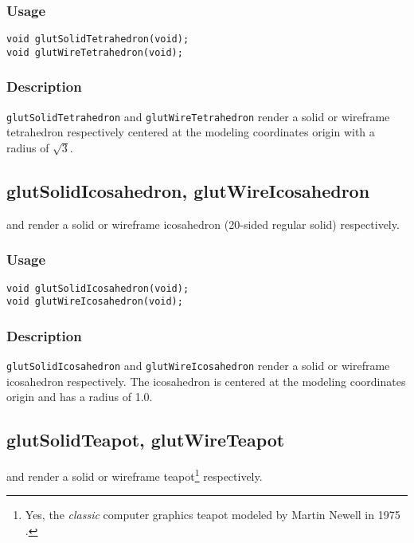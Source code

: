 \subsubsection*{Usage}
\begin{verbatim}
void glutSolidTetrahedron(void);
void glutWireTetrahedron(void);
\end{verbatim}

\subsubsection*{Description}

{\tt glutSolidTetrahedron} and {\tt glutWireTetrahedron} render a solid or wireframe
tetrahedron respectively centered at the modeling coordinates origin with a radius of $\sqrt{3}$.

\subsection{glutSolidIcosahedron, glutWireIcosahedron}

 and  render a solid or wireframe
icosahedron (20-sided regular solid) respectively.

\subsubsection*{Usage}
\begin{verbatim}
void glutSolidIcosahedron(void);
void glutWireIcosahedron(void);
\end{verbatim}

\subsubsection*{Description}

{\tt glutSolidIcosahedron} and {\tt glutWireIcosahedron} render a solid or wireframe
icosahedron respectively.  The icosahedron is centered at the modeling coordinates origin and has a radius
of 1.0.

\subsection{glutSolidTeapot, glutWireTeapot}

 and  render a solid or wireframe
teapot\footnote{Yes, the {\em classic} computer graphics teapot modeled
by Martin Newell in 1975 \cite{crow87}.} respectively.

